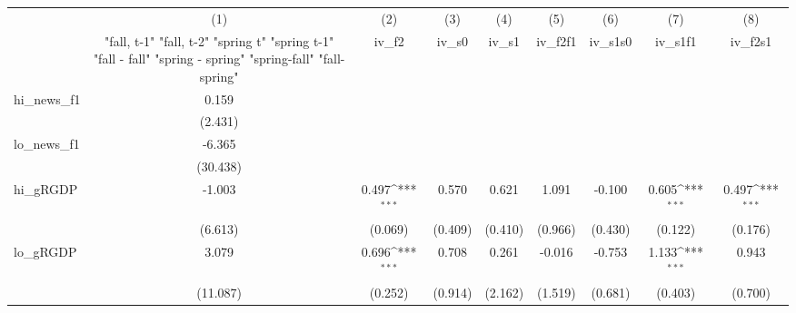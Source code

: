 {
\def\sym#1{\ifmmode^{#1}\else\(^{#1}\)\fi}
\begin{tabular}{l*{8}{c}}
\toprule
            &\multicolumn{1}{c}{(1)}&\multicolumn{1}{c}{(2)}&\multicolumn{1}{c}{(3)}&\multicolumn{1}{c}{(4)}&\multicolumn{1}{c}{(5)}&\multicolumn{1}{c}{(6)}&\multicolumn{1}{c}{(7)}&\multicolumn{1}{c}{(8)}\\
            &\multicolumn{1}{c}{  "fall, t-1" "fall, t-2" "spring t" "spring t-1"  "fall - fall" "spring - spring" "spring-fall" "fall-spring" }&\multicolumn{1}{c}{iv\_f2}&\multicolumn{1}{c}{iv\_s0}&\multicolumn{1}{c}{iv\_s1}&\multicolumn{1}{c}{iv\_f2f1}&\multicolumn{1}{c}{iv\_s1s0}&\multicolumn{1}{c}{iv\_s1f1}&\multicolumn{1}{c}{iv\_f2s1}\\
\midrule
hi\_news\_f1  &       0.159         &                     &                     &                     &                     &                     &                     &                     \\
            &     (2.431)         &                     &                     &                     &                     &                     &                     &                     \\
\addlinespace
lo\_news\_f1  &      -6.365         &                     &                     &                     &                     &                     &                     &                     \\
            &    (30.438)         &                     &                     &                     &                     &                     &                     &                     \\
\addlinespace
hi\_gRGDP    &      -1.003         &       0.497\sym{***}&       0.570         &       0.621         &       1.091         &      -0.100         &       0.605\sym{***}&       0.497\sym{***}\\
            &     (6.613)         &     (0.069)         &     (0.409)         &     (0.410)         &     (0.966)         &     (0.430)         &     (0.122)         &     (0.176)         \\
\addlinespace
lo\_gRGDP    &       3.079         &       0.696\sym{***}&       0.708         &       0.261         &      -0.016         &      -0.753         &       1.133\sym{***}&       0.943         \\
            &    (11.087)         &     (0.252)         &     (0.914)         &     (2.162)         &     (1.519)         &     (0.681)         &     (0.403)         &     (0.700)         \\

\end{tabular}}
